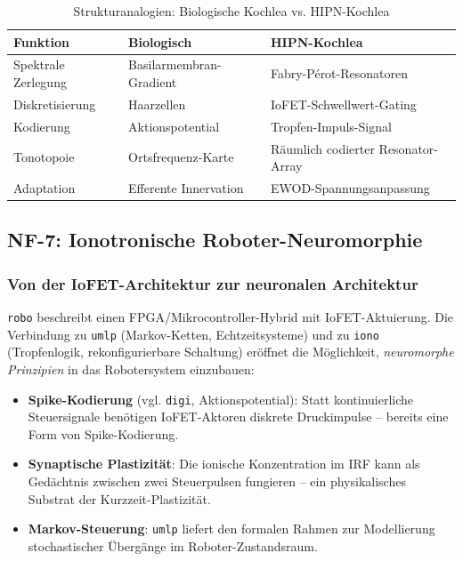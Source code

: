 ﻿\documentclass[a4paper,12pt]{scrreprt}
\theoremstyle{definition}
\begin{document}
\begin{table}[H]
\caption{Strukturanalogien: Biologische Kochlea vs. HIPN-Kochlea}
\label{tab:kochlea}
\begin{tabular}{lll}
\toprule
\textbf{Funktion} & \textbf{Biologisch} & \textbf{HIPN-Kochlea} \\
\midrule
Spektrale Zerlegung & Basilarmembran-Gradient & Fabry-Pérot-Resonatoren \\
Diskretisierung & Haarzellen & IoFET-Schwellwert-Gating \\
Kodierung & Aktionspotential & Tropfen-Impuls-Signal \\
Tonotopoie & Ortsfrequenz-Karte & Räumlich codierter Resonator-Array \\
Adaptation & Efferente Innervation & EWOD-Spannungsanpassung \\
\bottomrule
\end{tabular}
\end{table}

\subsection{NF-7: Ionotronische Roboter-Neuromorphie}

\subsubsection{Von der IoFET-Architektur zur neuronalen Architektur}

\texttt{robo} beschreibt einen FPGA/Mikrocontroller-Hybrid mit IoFET-Aktuierung.
Die Verbindung zu \texttt{umlp} (Markov-Ketten, Echtzeitsysteme) und
zu \texttt{iono} (Tropfenlogik, rekonfigurierbare Schaltung) eröffnet die
Möglichkeit, \emph{neuromorphe Prinzipien} in das Robotersystem einzubauen:

\begin{itemize}
  \item \textbf{Spike-Kodierung} (vgl. \texttt{digi}, Aktionspotential):
    Statt kontinuierliche Steuersignale benötigen IoFET-Aktoren diskrete
    Druckimpulse -- bereits eine Form von Spike-Kodierung.
  \item \textbf{Synaptische Plastizität}: Die ionische Konzentration im
    IRF kann als Gedächtnis zwischen zwei Steuerpulsen fungieren --
    ein physikalisches Substrat der Kurzzeit-Plastizität.
  \item \textbf{Markov-Steuerung}: \texttt{umlp} liefert den formalen
    Rahmen zur Modellierung stochastischer Übergänge im Roboter-Zustandsraum.
\end{itemize}
\end{document}
